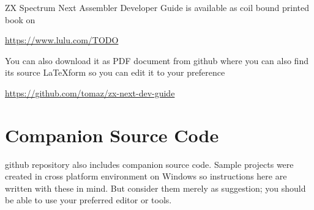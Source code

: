 \documentclass[12pt,twoside,openright,a4paper]{book}
\begin{document}
ZX Spectrum Next Assembler Developer Guide is available as coil bound printed book on

\url{https://www.lulu.com/TODO}

You can also download it as PDF document from github where you can also find its source \LaTeX form so you can edit it to your preference

\url{https://github.com/tomaz/zx-next-dev-guide}


\section{Companion Source Code}

github repository also includes companion source code. Sample projects were created in cross platform environment on Windows so instructions here are written with these in mind. But consider them merely as suggestion; you should be able to use your preferred editor or tools.
\end{document}
